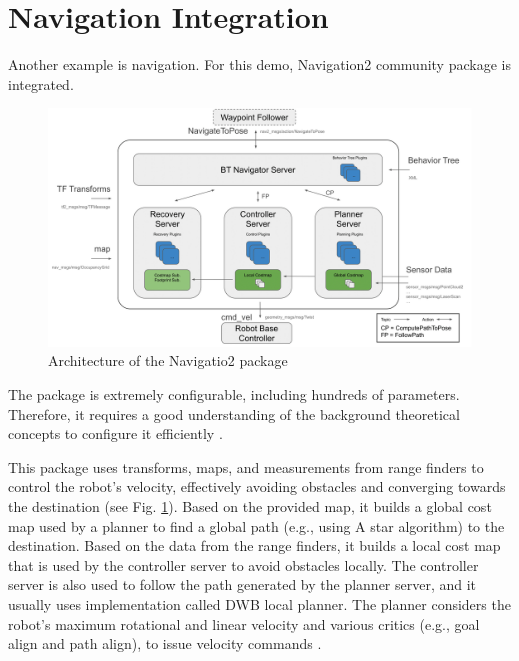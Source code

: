 \section{Navigation Integration}
Another example is navigation.
For this demo, Navigation2 community package is integrated.  
\begin{figure}[H]
    \centering
    \includegraphics[width=\textwidth]{demos/figures/navigation_overview.png}
    \caption[Architecture of the Navigatio2 package]{Architecture of the Navigatio2 package\footnotemark}
    \label{fig:demos:navigation_overview}
\end{figure}

The package is extremely configurable, including hundreds of parameters.
Therefore, it requires a good understanding of the background theoretical concepts to configure it efficiently \cite{zheng_ros_nodate}.

This package uses transforms, maps, and measurements from range finders to control the robot's velocity, effectively avoiding obstacles and converging towards the destination (see Fig. \ref{fig:demos:navigation_overview}).
Based on the provided map, it builds a global cost map used by a planner to find a global path (e.g., using A star algorithm) to the destination.
Based on the data from the range finders, it builds a local cost map that is used by the controller server to avoid obstacles locally.
The controller server is also used to follow the path generated by the planner server, and it usually uses implementation called DWB local planner.
The planner considers the robot's maximum rotational and linear velocity and various critics (e.g., goal align and path align), to issue velocity commands \cite{macenski_marathon_2020-1}. 

